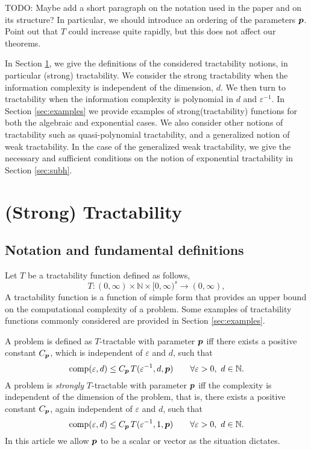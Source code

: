 \documentclass[11pt,a4paper]{article}
\newcommand{\fred}[1]{\begingroup\color{blue}#1\endgroup}
\newcommand{\peter}[1]{\begingroup\color{purple}#1\endgroup}
\newcommand{\kachi}[1]{\begingroup\color{ForestGreen}#1\endgroup}
\begin{document}
\peter{TODO: Maybe add a short paragraph on the notation used in the paper and on its structure? In particular, we should introduce
an ordering of the parameters $\boldsymbol{p}$.}\\

\fred{Point out that $T$ could increase quite rapidly, but this does not affect our theorems.}

\kachi{In Section \ref{sec:spt}, we give the definitions of the considered tractability notions, in particular (strong) tractability. We consider the strong tractability when the information complexity is independent of the dimension, $d$. We then turn to tractability  when the information complexity is polynomial in $d$ and $\varepsilon^{-1}$. In Section \ref{sec:examples} we provide examples of strong(tractability) functions for both the algebraic and exponential cases. We also consider other notions of tractability such as quasi-polynomial tractability, and a generalized notion of weak tractability. In the case of the generalized weak tractability, we give the necessary and sufficient conditions on the notion of exponential tractability in Section \ref{sec:subh}. }

\section{(Strong) Tractability}\label{sec:spt}

\subsection{Notation and fundamental definitions} \label{sec:not}
Let $T$ be a tractability function defined as follows,
\begin{equation} \label{eq:Tspec}
    T :(0,\infty) \times \mathbb{N} \times [0,\infty)^s \rightarrow (0,\infty),
\end{equation}
A tractability function is a function of simple form that provides an upper bound on the computational complexity of a problem.  Some examples of tractability functions commonly considered are provided in Section \ref{sec:examples}.


A problem is defined as $T$-tractable with parameter $\boldsymbol{p}$ iff there exists a positive constant $C_{\boldsymbol{p}}$, which is independent of $\varepsilon$ and $d$, such that
\begin{equation} \label{eq:tract_def}
	\operatorname{comp}(\varepsilon,d) \le C_{\boldsymbol{p}}\, T(\varepsilon^{-1},d,\boldsymbol{p}) \qquad \forall \varepsilon >0, \ d \in \mathbb{N}.
\end{equation}
A problem is \emph{strongly}
$T$-tractable with parameter $\boldsymbol{p}$ iff the complexity is independent of the dimension of the problem, that is, there exists a positive constant $C_{\boldsymbol{p}}$, again independent of $\varepsilon$ and $d$, such that
\begin{equation} \label{eq:strong_tract_def}
	\operatorname{comp}(\varepsilon,d) \le C_{\boldsymbol{p}}\, T(\varepsilon^{-1},1,\boldsymbol{p}) \qquad \forall \varepsilon >0 , \ d \in \mathbb{N}.
\end{equation}
In this article we allow $\boldsymbol{p}$ to be a scalar or vector as the situation dictates.
\end{document}
